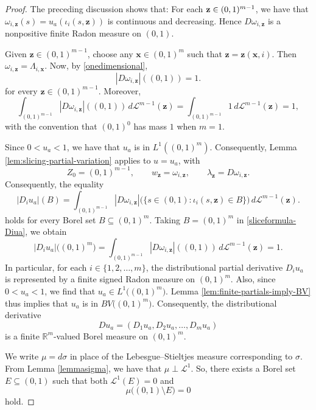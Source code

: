 \documentclass{publicadapt}
\begin{document}
\begin{proof}
 The preceding discussion shows that: For each $ \text{{\bf z}} \in (0,1)^{m-1}$, we have that 
$
\omega_{i,\mathbf z}(s)=u_a(\iota_i(s,\mathbf z))
$
is continuous and decreasing. Hence \(D\omega_{i,\mathbf z}\) is a nonpositive finite Radon measure on
\((0,1)\).

Given \(\mathbf z\in(0,1)^{m-1}\), choose any
$\mathbf x\in(0,1)^m$ such that
$
\mathbf z=\mathbf z(\mathbf x,i)$. 
Then
$
\omega_{i,\mathbf z}=\Lambda_{i,\mathbf x}$. Now, by \eqref{onedimensional},
\begin{equation}\label{onedimensional-omega}
|D\omega_{i,\mathbf z}|((0,1))=1.
\end{equation}
for every \(\mathbf z\in(0,1)^{m-1}\).
 Moreover,
\[
\int_{(0,1)^{m-1}}
|D\omega_{i,\mathbf z}|((0,1))\,d\mathcal L^{m-1}(\mathbf z)
=
\int_{(0,1)^{m-1}}1\,d\mathcal L^{m-1}(\mathbf z)
=
1,
\]
with the convention that \((0,1)^0\) has mass \(1\) when \(m=1\).

Since $0 < u_a < 1$,   we have that   $  u_a$ is in $ L^1((0,1)^m)$. Consequently, Lemma \ref{lem:slicing-partial-variation} applies to \(u=u_a\), with
$$
Z_0=(0,1)^{m-1},
\qquad
w_{\mathbf z}=\omega_{i,\mathbf z},
\qquad   \lambda_{\mathbf z}=D\omega_{i,\mathbf z}. $$ Consequently, the equality 
\begin{equation}\label{sliceformula-Diua}
|D_i u_a|(B) = \int_{(0,1)^{m-1}}
|D\omega_{i,\mathbf z}|
\bigl(\{s\in(0,1):\iota_i(s,\mathbf z)\in B\}\bigr)
\,d\mathcal L^{m-1}(\mathbf z).
\end{equation}
 holds for every Borel set $B\subseteq(0,1)^m$.  Taking $B = (0,1)^m$ in  \eqref{sliceformula-Diua}, we obtain
\begin{equation}\label{latersummand}
\left|D_i u_a\right|\big((0,1)^m\big) = \int_{(0,1)^{m-1}}
|D\omega_{i,\mathbf z}|((0,1))
\,d\mathcal L^{m-1}(\mathbf z)  = 1. 
\end{equation}
 In particular, for each $i \in \{1, 2, \ldots, m\}$, the distributional partial derivative \(D_i u_a\) is represented by a finite signed Radon measure on $(0,1)^m$. Also, 
 since $0 < u_a < 1$, we find that $u_a \in L^1\big( (0,1)^m \big)$. Lemma \ref{lem:finite-partials-imply-BV} thus implies that
$ u_a$ is in $ BV\big( (0,1)^m \big)$. Consequently, the distributional derivative 
 $$ Du_a=(D_1u_a,D_2u_a,\ldots,D_m u_a) $$
is a finite \(\mathbb R^m\)-valued Borel measure on \((0,1)^m\).

 We write $\mu = d \sigma$ in place of the Lebesgue--Stieltjes measure corresponding to $\sigma$. From Lemma \ref{lemmasigma}, we have that $\mu \perp \mathcal{L}^{1}$. So, there 
 exists a Borel set $E \subseteq (0, 1)$ such that both $\mathcal{L}^{1}(E) = 0$ and 
\begin{equation}\label{muconcentrated} 
 \mu\big( (0, 1) \setminus E \big) = 0
\end{equation}
 hold. 


\end{proof}
\end{document}

